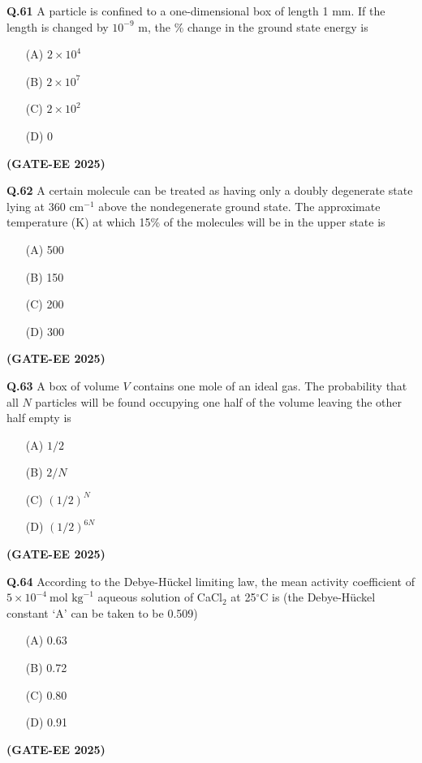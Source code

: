 \documentclass[12pt]{article}
\begin{document}
\begin{enumerate}
\textbf{Q.61} A particle is confined to a one-dimensional box of length 1 mm. If the length is changed by $10^{-9}$ m, the \% change in the ground state energy is

\begin{enumerate}
\item[(A)] $2 \times 10^4$
\item[(B)] $2 \times 10^7$
\item[(C)] $2 \times 10^2$
\item[(D)] 0
\end{enumerate}   \textbf{(GATE-EE 2025)}


\vspace{0.5cm}

\textbf{Q.62} A certain molecule can be treated as having only a doubly degenerate state lying at 360 cm$^{-1}$ above the nondegenerate ground state. The approximate temperature (K) at which 15\% of the molecules will be in the upper state is

\begin{enumerate}
\item[(A)] 500
\item[(B)] 150
\item[(C)] 200
\item[(D)] 300
\end{enumerate}   \textbf{(GATE-EE 2025)}


\vspace{0.5cm}

\textbf{Q.63} A box of volume $V$ contains one mole of an ideal gas. The probability that all $N$ particles will be found occupying one half of the volume leaving the other half empty is

\begin{enumerate}
\item[(A)] $1/2$
\item[(B)] $2/N$
\item[(C)] $(1/2)^N$
\item[(D)] $(1/2)^{6N}$
\end{enumerate}   \textbf{(GATE-EE 2025)}


\vspace{0.5cm}

\textbf{Q.64} According to the Debye-Hückel limiting law, the mean activity coefficient of $5 \times 10^{-4}~\text{mol kg}^{-1}$ aqueous solution of CaCl$_2$ at 25$^\circ$C is (the Debye-Hückel constant ‘A’ can be taken to be 0.509)

\begin{enumerate}
\item[(A)] 0.63
\item[(B)] 0.72
\item[(C)] 0.80
\item[(D)] 0.91
\end{enumerate}   \textbf{(GATE-EE 2025)}



\end{enumerate}
\end{document}

